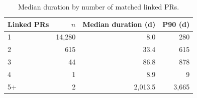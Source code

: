 \begin{table}[t]
\centering
\caption{Median duration by number of matched linked PRs.\label{tab:categories}}
\small \begin{tabular}{@{}lrrr@{}}
\toprule
Linked PRs & $n$ & Median duration (d) & P90 (d) \\\midrule
1 & 14,280 & 8.0 & 280 \\
2 & 615 & 33.4 & 615 \\
3 & 44 & 86.8 & 878 \\
4 & 1 & 8.9 & 9 \\
5+ & 2 & 2,013.5 & 3,665 \\
\bottomrule
\end{tabular}
\par{}
\end{table}
